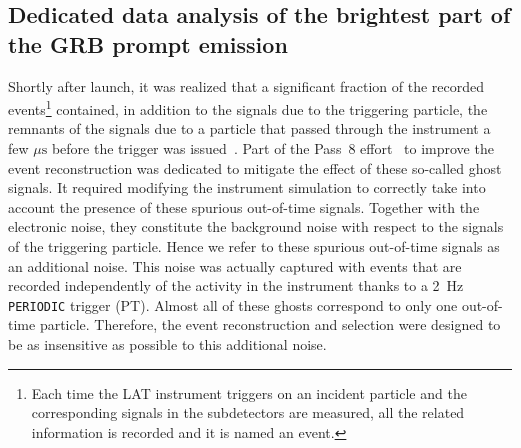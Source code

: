 \documentclass[preprint]{aastex631}
\begin{document}
\subsection{Dedicated data analysis of the brightest part of the GRB prompt emission} 
\label{sec:BTI_prescriptions}
Shortly after launch, it was realized that a significant fraction of the recorded events\footnote{Each time the LAT instrument triggers on an incident particle and the corresponding signals in the subdetectors are measured, all the related information is recorded and it is named an event.} contained, in addition to the signals due to the triggering particle, the remnants of the signals due to a particle that passed through the instrument a few $\mu \mathrm{s}$ before the trigger was issued~\citep{2012ApJS..203....4A}. Part of the Pass~8 effort~\citep{2013arXiv1303.3514A} to improve the event reconstruction was dedicated to mitigate the effect of these so-called ghost signals. 
It required modifying the instrument simulation to correctly take into account the presence of these spurious out-of-time signals. Together with the electronic noise, they constitute the background noise with respect to the signals of the triggering particle. Hence we refer to these spurious out-of-time signals as an additional noise. This noise was actually captured with events that are recorded independently of the activity in the instrument thanks to a 2~Hz {\tt PERIODIC} trigger (PT). Almost all of these ghosts correspond to only one out-of-time particle. Therefore, the event reconstruction and selection were designed to be as insensitive as possible to this additional noise.
\end{document}
